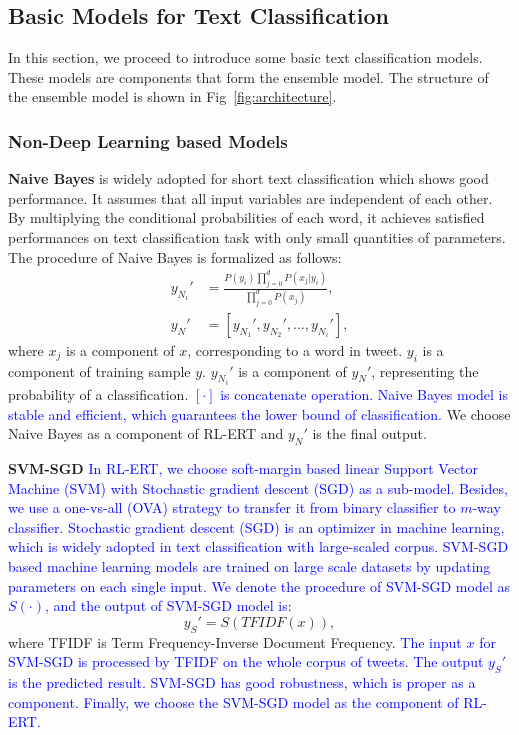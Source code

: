\documentclass[review]{elsarticle}
\begin{document}
\subsection{Basic Models for Text Classification}
\label{sec:deeplearning_model} 
In this section, we proceed to introduce some basic text classification models. These models are components that form the ensemble model. The structure of the ensemble model is shown in Fig~\ref{fig:architecture}.

\subsubsection{Non-Deep Learning based Models}
\textbf{Naive Bayes} \cite{DBLP:journals/ml/DomingosP97} is widely adopted for short text classification which shows good performance. It assumes that all input variables are independent of each other. By multiplying the conditional probabilities of each word, it achieves satisfied performances on text classification task with only small quantities of parameters. The procedure of Naive Bayes is formalized as follows:
\begin{align}\label{eq:nb}
y_{N_{i}}' &= \frac{P(y_i)\prod_{j = 0}^d P(x_j|y_i)}{\prod_{j = 0}^d P(x_j)},\\
y_N' &= [y_{N_{1}}',y_{N_{2}}',..., y_{N_{i}}'],
\end{align}
where $x_j$ is a component of $x$, corresponding to a word in tweet.  $y_i$ is a component of training sample $y$. $y_{N_{i}}'$ is a component of $y_N'$, representing the probability of a classification. \textcolor{blue}{$[\cdot]$ is concatenate operation. Naive Bayes model is stable and efficient, which guarantees the lower bound of classification.} We choose Naive Bayes as a component of RL-ERT and $y_N'$ is the final output.

\textbf{SVM-SGD} \cite{avriel2003nonlinear} \textcolor{blue}{In RL-ERT, we choose soft-margin based linear Support Vector Machine (SVM) with Stochastic gradient descent (SGD) as a sub-model. Besides, we use a one-vs-all (OVA) strategy to transfer it from binary classifier to $m$-way classifier. Stochastic gradient descent (SGD) is an optimizer in machine learning, which is widely adopted in text classification with large-scaled corpus. SVM-SGD based machine learning models are trained on large scale datasets by updating parameters on each single input. We denote the procedure of SVM-SGD model as $S(\cdot)$, and the output of SVM-SGD model is}:
\begin{equation}\label{eq:sgd}
y_S' = S(TFIDF(x)),
\end{equation}
where TFIDF is Term Frequency-Inverse Document Frequency. \textcolor{blue}{The input $x$ for SVM-SGD is processed by TFIDF on the whole corpus of tweets. The output $y_S'$ is the predicted result. SVM-SGD has good robustness, which is proper as a component.  Finally, we choose the SVM-SGD model as the component of RL-ERT.}
\end{document}
